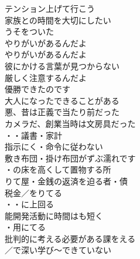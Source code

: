 \begin{multicols}{2}
テンション上げて行こう\\
家族との時間を大切にしたい\\
うそをついた\\
やりがいがあるんだよ\\
やりがいがあるんだよ\\
彼にかける言葉が見つからない\\
厳しく注意するんだよ\\
優勝できたのです\\
大人になったできることがある\\
悪、昔は正義で当たり前だった\\
カメラだ、創業当時は文房具だった\\

・・議書・家計\\
指示にく・命令に従わない\\
敷き布団・掛け布団がずぶ濡れです\\
・の床を高くして置物する所\\

りて屋・金銭の返済を迫る者・債\\
税金／をりてる\\

・・に上回る\\
能開発活動に時間はも短く\\
・用にてる\\
批判的に考える必要がある課をえる\\
／で深い学び〜できていない\\


\end{multicols}
